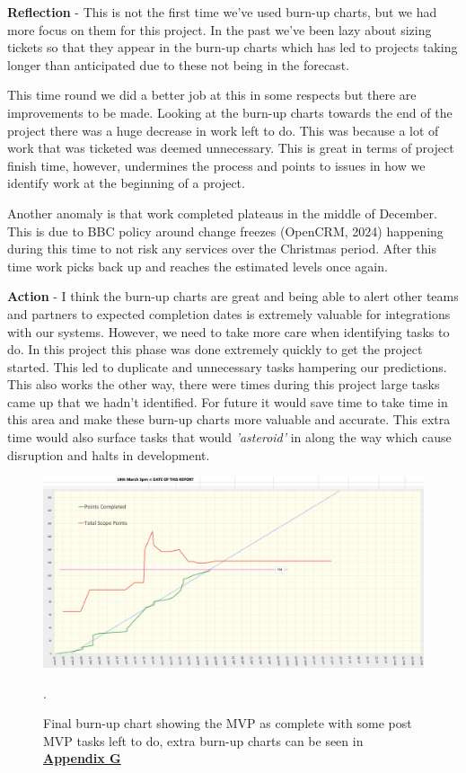   \vspace{0.2cm}
  \textbf{Reflection} - This is not the first time we've used burn-up charts, but we had more focus on them for this project. In the past we've been 
  lazy about sizing tickets so that they appear in the burn-up charts which has led to projects taking longer than anticipated due to these not 
  being in the forecast.

  This time round we did a better job at this in some respects but there are improvements to be made. Looking at the burn-up charts towards the end of the 
  project there was a huge decrease in work left to do. This was because a lot of work that was ticketed was deemed unnecessary. This is great in terms of 
  project finish time, however, undermines the process and points to issues in how we identify work at the beginning of a project.

  Another anomaly is that work completed plateaus in the middle of December. This is due to BBC policy around change freezes (OpenCRM, 2024) happening 
  during this time to not risk any services over the Christmas period. After this time work picks back up and reaches the estimated levels once again.

  \vspace{0.2cm}
  \textbf{Action} - I think the burn-up charts are great and being able to alert other teams and partners to expected completion dates is extremely
  valuable for integrations with our systems. However, we need to take more care when identifying tasks to do. In this project this phase was done 
  extremely quickly to get the project started. This led to duplicate and unnecessary tasks hampering our predictions. This also works the other way, 
  there were times during this project large tasks came up that we hadn't identified. For future it would save time to take time in this area and make these 
  burn-up charts more valuable and accurate. This extra time would also surface tasks that would \textit{'asteroid'} in along the way which cause disruption 
  and halts in development.

  \begin{figure}[H]
    \centering
    \includegraphics[width=12cm]{assets/outputs/burnups/finalBurnUp.png}
    \caption{Final burn-up chart showing the MVP as complete with some post MVP tasks left to do, extra burn-up charts can be seen in 
    \hyperref[sec:AppendixG]{\textbf{Appendix G}}}.
    \label{fig:finalBurnUp}
  \end{figure}

